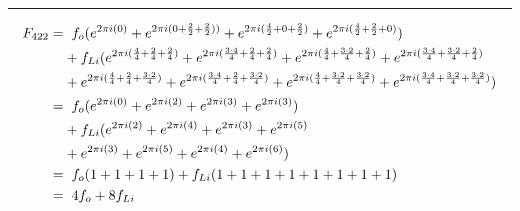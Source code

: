 \documentclass{article}
\begin{document}
\noindent\rule{12cm}{0.4pt}
\begin{align*}
	F_{422} =& \hspace{0.2cm}  f_{o}  (e^{2 \pi i (0)} 
	+ e^{2 \pi i (0 + \frac{2}{2} + \frac{2}{2}))} 
	+ e^{2 \pi i (\frac{4}{2} + 0 + \frac{2}{2})} 
	+ e^{2 \pi i (\frac{4}{2} + \frac{2}{2} + 0)})  \\
	&+ f_{Li} (e^{2 \pi i (\frac{4}{4} + \frac{2}{4} + \frac{2}{4})}  
	+ e^{2 \pi i (\frac{3 \cdot 4}{4} + \frac{2}{4} + \frac{2}{4})} 
	+ e^{2 \pi i (\frac{4}{4} + \frac{3 \cdot 2}{4} + \frac{2}{4})} 
	+ e^{2 \pi i (\frac{3 \cdot 4}{4} + \frac{3 \cdot 2}{4} + \frac{2}{4})} \\
	&+ e^{2 \pi i (\frac{4}{4} + \frac{2}{4} + \frac{3 \cdot 2}{4})}
	+ e^{2 \pi i (\frac{3 \cdot 4}{4} + \frac{2}{4} + \frac{3 \cdot 2}{4})} 
	+ e^{2 \pi i (\frac{4}{4} + \frac{3 \cdot 2}{4} + \frac{3 \cdot 2}{4})} 
	+ e^{2 \pi i (\frac{3 \cdot 4}{4} + \frac{3 \cdot 2}{4} + \frac{3 \cdot 2}{4})}) \\  
	=& \hspace{0.2cm}  f_{o}  (e^{2 \pi i (0)} 
	+ e^{2 \pi i (2)} 
	+ e^{2 \pi i (3)} 
	+ e^{2 \pi i (3)})  \\
	&+ f_{Li} (e^{2 \pi i (2)}  
	+ e^{2 \pi i (4)} 
	+ e^{2 \pi i (3)} 
	+ e^{2 \pi i (5)} \\
	&+ e^{2 \pi i (3)}
	+ e^{2 \pi i (5)} 
	+ e^{2 \pi i (4)} 
	+ e^{2 \pi i (6)}) \\
	=& \hspace{0.2cm}  f_{o}  (1  + 1 + 1 + 1) + f_{Li}(1 + 1 + 1 + 1 + 1 + 1 + 1 + 1) \\
	=& \hspace{0.2cm} 4f_{o}   + 8f_{Li}
\end{align*}
\end{document}
